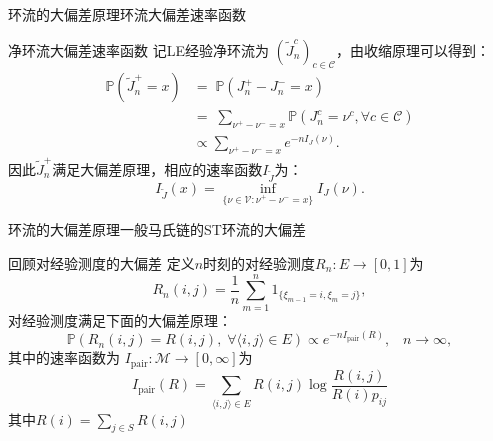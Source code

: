 \documentclass{beamer}
\begin{document}
\begin{frame}{环流的大偏差原理}{环流大偏差速率函数}
	\begin{block}{净环流大偏差速率函数}
		记LE经验净环流为 $(\tilde{J}^{c}_n)_{c\in\mathcal{C}}$，由收缩原理可以得到：
		\begin{align*}
			\mathbb{P}\left(\tilde{J}^{+}_n = x\right)
			 & =\;\mathbb{P}\left(J^{+}_n-J^{-}_n = x\right)                                             \\
			 & =\;\sum_{\nu^{+}-\nu^{-}=x}\mathbb{P}\left(J^{c}_n=\nu^{c},\forall c\in\mathcal{C}\right) \\
			 & \propto\sum_{\nu^{+}-\nu^{-}=x} e^{-nI_J(\nu)}.
		\end{align*}
		因此$\tilde{J}^+_n$满足大偏差原理，相应的速率函数$I_{\tilde{J}}$为：
		\begin{equation*}
			I_{\tilde{J}}(x)=\inf_{\{\nu\in\mathcal{V}:\nu^{+}-\nu^{-}= x\}}I_J(\nu).
		\end{equation*}
	\end{block}
\end{frame}

\begin{frame}{环流的大偏差原理}{一般马氏链的ST环流的大偏差}
	\begin{block}{回顾对经验测度的大偏差}
		定义$n$时刻的对经验测度$R_n:E\rightarrow[0,1]$为
		\begin{equation*}
			R_n(i,j) = \frac{1}{n}\sum_{m=1}^n1_{\{\xi_{m-1}=i,\xi_m=j\}},
		\end{equation*}
		对经验测度满足下面的大偏差原理：
		\begin{equation*}
			\mathbb{P}(R_n(i,j)=R(i,j),\;\forall\langle i,j\rangle\in E)\propto e^{-nI_{\mathrm{pair}}(R)},\;\;\;n\to\infty,
		\end{equation*}
		其中的速率函数为 $I_{\mathrm{pair}}:\mathcal{M}\rightarrow[0,\infty]$为
		\begin{equation*}
			I_{\mathrm{pair}}(R) = \sum_{\langle i,j\rangle\in E}R(i,j)\log\frac{R(i,j)}{R(i)p_{ij}}
		\end{equation*}
		其中$R(i)=\sum_{j\in S}R(i,j)$
	\end{block}
\end{frame}
\end{document}
